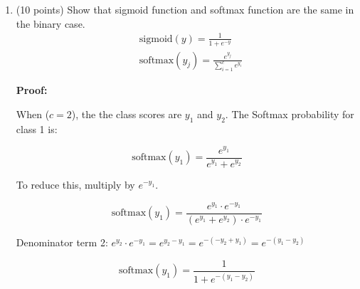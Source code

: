 \documentclass[11pt]{article}
\begin{document}
\begin{enumerate}
\begin{enumerate}
{    \[
    \boldsymbol{w}^* = (X^T X)^{-1} X^T {y}
    \]

    \textbf{2. Optimal $\sigma^*$:}
    
 $S = RSS(\boldsymbol{w}^*)$ is the sum of squared errors from our best-fit line. 

the variance of a distribution is the average squared deviation from the mean. The optimal variance is the average of the squared deviations:
\[
\sigma^2 = \frac{S}{n} = \frac{RSS(\boldsymbol{w}^*)}{n}
\]

 taking the derivative of with respect to the variance $\sigma^2$ and setting it to zero:
\[
\frac{\partial}{\partial (\sigma^2)} \left( \frac{S}{\sigma^2} + n \ln(\sigma^2) \right) = -\frac{S}{(\sigma^2)^2} + \frac{n}{\sigma^2} = 0
\]
multiplying  by $(\sigma^2)^2$:
\[
-S + n(\sigma^2) = 0 -> \sigma^2 = \frac{S}{n}
\]
\[
\sigma^* = \sqrt{\frac{RSS(\boldsymbol{w}^*)}{n}}
\]
}

    \item (5 points) What do you observe from the optimal $\sigma^*$?
    
    {\color{red}
    The optimal variance $(\sigma^*)^2$ is the \textbf{Mean Squared Error (MSE)} of the model on the training data. The best estimate for the noise variance is simply the average squared deviation of the data points from the best-fit line.
    }
\end{enumerate}

\item (10 points) Show that sigmoid function and
softmax function are the same in the binary case.
\begin{align*}
    &\mbox{sigmoid}(y) = \frac{1}{1 + e^{-y}}\\
    &\mbox{softmax}(y_j) = \frac{e^{y_j}}{\sum_{i=1}^c e^{y_i}} 
\end{align*}

{\color{red}
\textbf{Proof:}

When ($c=2$), the the class scores are $y_1$ and $y_2$. The Softmax probability for class 1 is:

\[
\text{softmax}(y_1) = \frac{e^{y_1}}{e^{y_1} + e^{y_2}}
\]

To reduce this, multiply by $e^{-y_1}$. 

\[
\text{softmax}(y_1) = \frac{e^{y_1} \cdot e^{-y_1}}{(e^{y_1} + e^{y_2}) \cdot e^{-y_1}}
\]

Denominator term 2: $e^{y_2} \cdot e^{-y_1} = e^{y_2 - y_1} = e^{-(-y_2 + y_1)} = e^{-(y_1 - y_2)}$

\[
\text{softmax}(y_1) = \frac{1}{1 + e^{-(y_1 - y_2)}}
\]

}
\end{enumerate}
\end{document}
